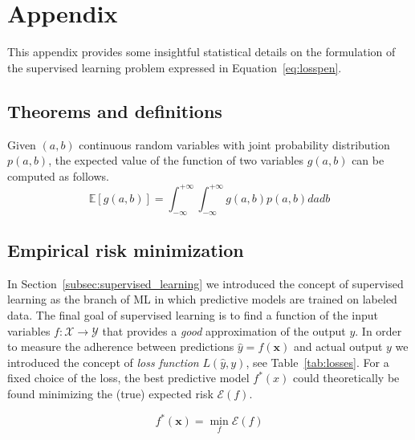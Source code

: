 \appendix

\chapter{Appendix} \label{appendix:A}
This appendix provides some insightful statistical details on the formulation of the supervised learning problem expressed in Equation~\eqref{eq:losspen}.


\section{Theorems and definitions}

\begin{theorem} \label{th:lotus}
	Given $(a,b)$ continuous random variables with joint probability distribution $p(a,b)$, the expected value of the function of two variables $g(a,b)$ can be computed as follows.
	$$\mathbb{E}[g(a,b)]=\int_{-\infty}^{+\infty}\int_{-\infty}^{+\infty}g(a,b)p(a,b)dadb$$
\end{theorem}


\section{Empirical risk minimization} \label{sec:erm}
In Section~\ref{subsec:supervised_learning} we introduced the concept of supervised learning as the branch of ML in which predictive models are trained on labeled data. The final goal of supervised learning is to find a function of the input variables $f: \mathcal{X} \rightarrow \mathcal{Y}$ that provides a \textit{good} approximation of the output $y$. In order to measure the adherence between predictions $\hat y = f(\bm{x})$ and actual output $y$ we introduced the concept of \textit{loss function} $L(\hat y, y)$, see Table~\ref{tab:losses}. For a fixed choice of the loss, the best predictive model $f^*(x)$ could theoretically be found minimizing the (true) expected risk $\mathcal{E}(f)$.

\begin{equation} \label{eq:fstar}
	f^*(\bm{x}) = \min_f{\mathcal{E}(f)}
\end{equation}

